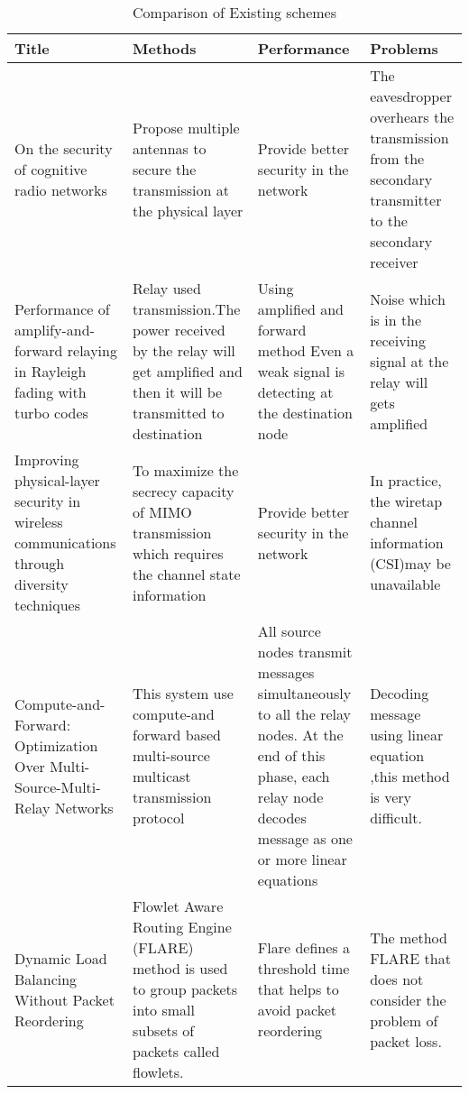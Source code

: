 

\newpage
\begin{table}
	\centering
	\caption{Comparison of Existing schemes}
	\label{table }
	\begin{tabular}{|p{2.7cm}|p{3.5cm}|p{3.5cm}|p{3.5cm}|}
		\hline
		Title &	Methods &	Performance & Problems \\
		
		\hline
		On the security of cognitive radio networks  & Propose multiple antennas to secure the transmission at  the physical layer & Provide better security in the network & The eavesdropper overhears the transmission from the secondary transmitter to the secondary receiver \\
		\hline 
		Performance of amplify-and-forward  relaying in Rayleigh fading with turbo codes &  Relay used transmission.The power received by the relay will get amplified and then it will be transmitted to destination & Using amplified and forward method Even a weak signal is detecting at the destination node & Noise which is  in the receiving signal at the relay will gets amplified \\
		\hline
		Improving physical-layer security in wireless communications through diversity techniques & To maximize the secrecy capacity of MIMO transmission which requires the channel state information & Provide better security in the network & In practice, the wiretap channel information (CSI)may be unavailable \\
		
		\hline	
		 Compute-and-Forward: Optimization Over Multi-Source-Multi-Relay Networks & This system use compute-and forward based multi-source multicast transmission protocol & All source nodes transmit  messages simultaneously to all the relay nodes. At the end of this phase, each relay node decodes message as one or more linear equations & Decoding message using linear equation ,this method is very difficult.\\
		 \hline
		 Dynamic Load Balancing Without Packet Reordering & Flowlet Aware Routing Engine (FLARE) method is used to group packets into small subsets of packets called flowlets. & Flare defines
		 a threshold time that helps to avoid packet reordering & The method  FLARE that does not consider the problem of packet loss.\\
		 \hline
		
		
			
	\end{tabular}
\end{table}
\\




